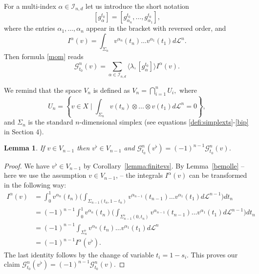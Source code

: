 \documentclass[12pt, reqno]{amsart}
\theoremstyle{plain}
\newtheorem {lemma}[theorem]{Lemma}
\theoremstyle{definition}
\theoremstyle{remark}
\numberwithin{equation}{section}
\renewcommand{\L}{\mathcal{L}}
\newcommand{\I}{\mathcal{I}}
\newcommand{\0}{\theta}
\renewcommand{\a}{\alpha}
\newcommand{\1}{{-1}}
\renewcommand{\=}{\coloneqq}
\renewcommand{\.}{\dots}
\newcommand{\mc}{\mathcal}
\begin{document}
 For a multi-index $\a\in\I_{n,d}$ let us introduce the short notation
\begin{equation}\label{plof}
  [g_{\a}^{t_0}]= [g_{\a_n }^{t_0}, \.,g_{\a_1}^{t_0}],
 \end{equation}
 where the entries $\a_1,\dots,\a_n$ appear in the bracket with reversed order, and 
 \begin{equation}\label{ivo}
I^\a (v) =\int_{\Sigma_n}v^{\a_n}(t_n)\.v^{\a_1}(t_1)d\L^n.
\end{equation}
 Then formula \eqref{mom}
 reads
 \begin{equation}\label{mom1}
\mc G^n _{t_0}(v ) = \sum_{\a\in\I _{n,d}} \langle \lambda, [g_{\a}^{t_0}]\rangle I^\a(v) .
\end{equation}
 
{\color{black} We remind that the space $V_n$ is defined as
$V_n=\bigcap_{i=1}^n U_i,$
where 
\[
U_n =\left\{ v\in X \mid \int_{\Sigma_n}v(t_n)\otimes \dots\otimes v(t_1) d\L^n =0 \right\},
\]
and $\Sigma_n$ is the standard $n$-dimensional simplex (see equations \eqref{defi:simplexts}-\eqref{bip} in Section 4).
} 
 
\begin{lemma}\label{lix}
 If $v\in V_{n-1}$ then $v^\flat \in V_{n-1}$ and $\mc G^n _{t_0}(v^\flat ) =(-1)^{n-1} \mc G^n _{t_0}(v) $.
\end{lemma}


\begin{proof} We have $v^\flat \in V_{n-1}$ by Corollary~\ref{lemma:finitevs}.  By Lemma~\ref{bemolle} -- here we use the assumption $v\in V_{n-1}$, -- the integrals $I^\a(v)$ can be transformed in the following way:
\[
\begin{split}
I^\a (v) & = \int_0^1 v^{\a_n}(t_n)\Big( \int_{\Sigma_{n-1}(t_n,1-t_n)  }v^{\a_{n-1}}(t_{n-1})\.v^{\a_1}(t_1)d\L^{n-1}\Big) dt_n
\\
&
=(-1)^{n-1} \int_0^1 v^{\a_n}(t_n)\Big( \int_{\Sigma_{n-1}^\flat(0,t_n)  }v^{\a_{n-1}}(t_{n-1})\.v^{\a_1}(t_1)d\L^{n-1}\Big) dt_n
\\
&
=(-1)^{n-1}  \int_{\Sigma_n  ^\flat }v^{\a_n}(t_n)\.v^{\a_1}(t_1)d\L^n
\\
&
=(-1)^{n-1}  I^\a(v^\flat).
\end{split}
\]
The last identity follows by the change of variable $t_i= 1-s_i$.
This proves our claim $\mc G^n _{t_0}(v^\flat ) =(-1)^{n-1} \mc G^n _{t_0}(v) $.


 \end{proof}
 
\end{document}
